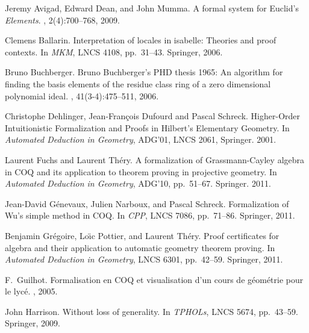 %

\begin{thebibliography}{10}

Jeremy Avigad, Edward Dean, and John Mumma.
\newblock A formal system for {E}uclid's \emph{{E}lements}.
, 2(4):700--768, 2009.

Clemens Ballarin.
\newblock Interpretation of locales in isabelle: Theories and proof contexts.
\newblock In {\em MKM}, LNCS 4108, pp.~31--43. Springer, 2006.

Bruno Buchberger.
\newblock Bruno Buchberger's PHD thesis 1965: An algorithm for finding the
  basis elements of the residue class ring of a zero dimensional polynomial
  ideal.
, 41(3-4):475--511, 2006.


Christophe Dehlinger, Jean-François Dufourd and Pascal Schreck.
\newblock Higher-Order Intuitionistic Formalization and Proofs in Hilbert’s Elementary Geometry.
\newblock In {\em Automated Deduction in Geometry}, ADG'01, LNCS 2061, Springer. 2001.



Laurent Fuchs and Laurent Th{\'e}ry.
\newblock A formalization of Grassmann-Cayley algebra in COQ and its
  application to theorem proving in projective geometry.
\newblock In {\em Automated Deduction in Geometry}, ADG'10, pp.~51--67. Springer. 2011.

Jean-David G{\'e}nevaux, Julien Narboux, and Pascal Schreck.
\newblock Formalization of Wu's simple method in COQ.
\newblock In {\em CPP}, LNCS 7086, pp.~71--86. Springer, 2011.

Benjamin Gr{\'e}goire, Lo\"{\i}c Pottier, and Laurent Th{\'e}ry.
\newblock Proof certificates for algebra and their application to automatic
  geometry theorem proving.
\newblock In {\em Automated Deduction in Geometry}, LNCS 6301, pp.~42--59. Springer, 2011.

F.~Guilhot.
\newblock Formalisation en COQ et visualisation d’un cours de g\'eom\'etrie
  pour le lyc\'e.
, 2005.


John Harrison.
\newblock Without loss of generality.
\newblock In {\em TPHOLs}, LNCS 5674, pp.~43--59. Springer, 2009.


\end{thebibliography}
